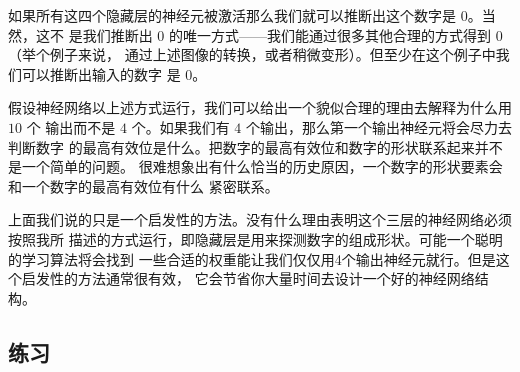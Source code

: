 如果所有这四个隐藏层的神经元被激活那么我们就可以推断出这个数字是 $0$。当然，这不
是我们推断出 $0$ 的唯一方式——我们能通过很多其他合理的方式得到 $0$ （举个例子来说，
  通过上述图像的转换，或者稍微变形）。但至少在这个例子中我们可以推断出输入的数字
是 $0$。

假设神经网络以上述方式运行，我们可以给出一个貌似合理的理由去解释为什么用 $10$ 个
输出而不是 $4$ 个。如果我们有 $4$ 个输出，那么第一个输出神经元将会尽力去判断数字
的最高有效位是什么。把数字的最高有效位和数字的形状联系起来并不是一个简单的问题。
很难想象出有什么恰当的历史原因，一个数字的形状要素会和一个数字的最高有效位有什么
紧密联系。

上面我们说的只是一个启发性的方法。没有什么理由表明这个三层的神经网络必须按照我所
描述的方式运行，即隐藏层是用来探测数字的组成形状。可能一个聪明的学习算法将会找到
一些合适的权重能让我们仅仅用4个输出神经元就行。但是这个启发性的方法通常很有效，
它会节省你大量时间去设计一个好的神经网络结构。

\subsection*{练习}

